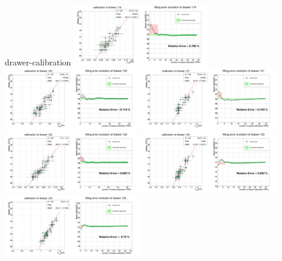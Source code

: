 \documentclass[11pt,compress,xcolor=x11names,UTF8]{beamer}
\begin{document}
\begin{frame}{drawer-calibration}
\vspace{-.5cm}
\includegraphics[width=0.45\textwidth]{sta101-18} 
\includegraphics[width=0.45\textwidth]{sta101-19} 
\includegraphics[width=0.45\textwidth]{sta101-20} 
\includegraphics[width=0.45\textwidth]{sta101-21} 
\includegraphics[width=0.45\textwidth]{sta101-22} 
\includegraphics[width=0.45\textwidth]{sta101-23} 
\end{frame}
\end{document}
